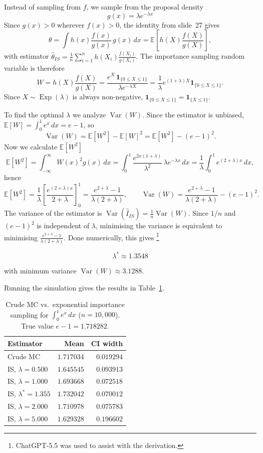 Instead of sampling from $f$, we sample from the proposal density
\[
g(x) = \lambda e^{-\lambda x}\]
Since $g(x) > 0$ wherever $f(x) > 0$, the identity from slide~27 gives
\[
\theta = \int h(x)\frac{f(x)}{g(x)}\,g(x)\,dx
       = \mathbb{E}\!\left[h(X)\frac{f(X)}{g(X)}\right],
\]
with estimator $\hat{\theta}_{IS} = \tfrac{1}{n}\sum_{i=1}^n h(X_i)\frac{f(X_i)}{g(X_i)}$.
The importance sampling random variable is therefore
\[
W = h(X)\frac{f(X)}{g(X)}
  = \frac{e^X\,\mathbf{1}_{\{0\le X\le 1\}}}{\lambda e^{-\lambda X}}
  = \frac{1}{\lambda}e^{(1+\lambda)X}\mathbf{1}_{\{0\le X\le 1\}}.
\]
Since $X \sim \operatorname{Exp}(\lambda)$ is always non-negative,
$\mathbf{1}_{\{0\le X\le 1\}} = \mathbf{1}_{\{X\le 1\}}$.

To find the optimal $\lambda$ we analyze $\operatorname{Var}(W)$. Since the estimator is unbiased, $\mathbb{E}[W]=\int_0^1 e^x\,dx = e-1$, so
\[
\operatorname{Var}(W)
=
\mathbb{E}[W^2]-\mathbb{E}[W]^2
=
\mathbb{E}[W^2]-(e-1)^2 .
\]
Now we calculate $\mathbb{E}[W^2]$
\[
\mathbb{E}[W^2]
=\int_{-\infty}^\infty W(x)^2 g(x)\,dx
=\int_0^1 \frac{e^{2x(1+\lambda)}}{\lambda^2}\,\lambda e^{-\lambda x}\,dx
=\frac{1}{\lambda}\int_0^1 e^{(2+\lambda)x}\,dx ,
\]
hence
\[
\mathbb{E}[W^2]
=\frac{1}{\lambda}\left[\frac{e^{(2+\lambda)x}}{2+\lambda}\right]_0^1
=\frac{e^{2+\lambda}-1}{\lambda(2+\lambda)},
\qquad
\operatorname{Var}(W)
=\frac{e^{2+\lambda}-1}{\lambda(2+\lambda)}-(e-1)^2 .
\]
The variance of the estimator is $\operatorname{Var}(\hat{I}_{IS}) =
\tfrac{1}{n}\operatorname{Var}(W)$. Since $1/n$ and $(e-1)^2$ is independent of $\lambda$,
minimising the variance is equivalent to minimising
$\frac{e^{2+\lambda}-1}{\lambda(2+\lambda)}$. Done numerically, this gives
\footnote{ChatGPT-5.5 was used to assist with the derivation.}

\[
\boxed{\lambda^* \approx 1.3548}
\]

with minimum variance $\operatorname{Var}(W) \approx 3.1288$.

Running the simulation gives the results in Table~\ref{tab:is8}.

\begin{table}[h]
\centering
\caption{Crude MC vs.\ exponential importance sampling for $\int_0^1 e^x\,dx$
($n=10{,}000$). True value $e-1 = 1.718282$.}
\label{tab:is8}
\begin{tabular}{lrr}
\toprule
Estimator & Mean & CI width \\
\midrule
Crude MC                       & $1.717034$ & $0.019294$ \\
IS, $\lambda=0.500$            & $1.645545$ & $0.093913$ \\
IS, $\lambda=1.000$            & $1.693668$ & $0.072518$ \\
IS, $\lambda^*=1.355$          & $1.732042$ & $0.070012$ \\
IS, $\lambda=2.000$            & $1.710978$ & $0.075783$ \\
IS, $\lambda=5.000$            & $1.629328$ & $0.196602$ \\
\bottomrule
\end{tabular}
\end{table}

